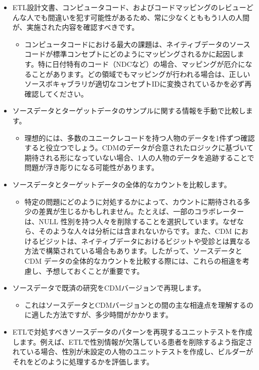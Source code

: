 \documentclass[
  11pt]{book}
\providecommand{\tightlist}{%
  \setlength{\itemsep}{0pt}\setlength{\parskip}{0pt}}
\theoremstyle{definition}
\theoremstyle{definition}
\theoremstyle{definition}
\theoremstyle{definition}
\theoremstyle{remark}
\begin{document}
\begin{itemize}
\tightlist
\item
  ETL設計文書、コンピュータコード、およびコードマッピングのレビューどんな人でも間違いを犯す可能性があるため、常に少なくとももう1人の人間が、実施された内容を確認すべきです。

  \begin{itemize}
  \tightlist
  \item
    コンピュータコードにおける最大の課題は、ネイティブデータのソースコードが標準コンセプトにどのようにマッピングされるかに起因します。特に日付特有のコード（NDCなど）の場合、マッピングが厄介になることがあります。どの領域でもマッピングが行われる場合は、正しいソースボキャブラリが適切なコンセプトIDに変換されているかを必ず再確認してください。
  \end{itemize}
\item
  ソースデータとターゲットデータのサンプルに関する情報を手動で比較します。

  \begin{itemize}
  \tightlist
  \item
    理想的には、多数のユニークレコードを持つ人物のデータを1件ずつ確認すると役立つでしょう。CDMのデータが合意されたロジックに基づいて期待される形になっていない場合、1人の人物のデータを追跡することで問題が浮き彫りになる可能性があります。
  \end{itemize}
\item
  ソースデータとターゲットデータの全体的なカウントを比較します。

  \begin{itemize}
  \tightlist
  \item
    特定の問題にどのように対処するかによって、カウントに期待される多少の差異が生じるかもしれません。たとえば、一部のコラボレーターは、NULL 性別を持つ人々を削除することを選択しています。なぜなら、そのような人々は分析には含まれないからです。また、CDM におけるビジットは、ネイティブデータにおけるビジットや受診とは異なる方法で構築されている場合もあります。したがって、ソースデータと CDM データの全体的なカウントを比較する際には、これらの相違を考慮し、予想しておくことが重要です。
  \end{itemize}
\item
  ソースデータで既済の研究をCDMバージョンで再現します。

  \begin{itemize}
  \tightlist
  \item
    これはソースデータとCDMバージョンとの間の主な相違点を理解するのに適した方法ですが、多少時間がかかります。
  \end{itemize}
\item
  ETLで対処すべきソースデータのパターンを再現するユニットテストを作成します。例えば、ETLで性別情報が欠落している患者を削除するよう指定されている場合、性別が未設定の人物のユニットテストを作成し、ビルダーがそれをどのように処理するかを評価します。


\end{itemize}
\end{document}

